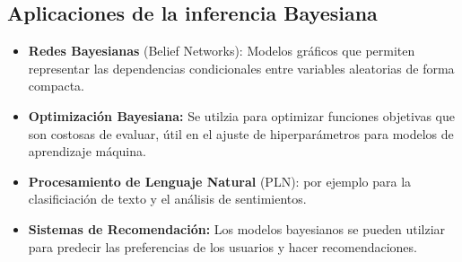 \subsection{Aplicaciones de la inferencia Bayesiana}
\begin{tcolorbox}[colback=blue!5!white, colframe=blue!75!black, title=\textbf{La inferencia bayesiana se utiliza en varias áreas del aprendizaje máquina}]
\begin{itemize}[label=\textbullet]
    \item \textbf{Redes Bayesianas} (Belief Networks): Modelos gráficos que permiten representar las dependencias condicionales entre variables aleatorias de forma compacta.
    \item \textbf{Optimización Bayesiana:} Se utilzia para optimizar funciones objetivas que son costosas de evaluar, útil en el ajuste de hiperparámetros para modelos de aprendizaje máquina.
    \item \textbf{Procesamiento de Lenguaje Natural} (PLN): por ejemplo para la clasificiación de texto y el análisis de sentimientos.
    \item \textbf{Sistemas de Recomendación:} Los modelos bayesianos se pueden utilziar para predecir las preferencias de los usuarios y hacer recomendaciones.
\end{itemize}
\end{tcolorbox}
